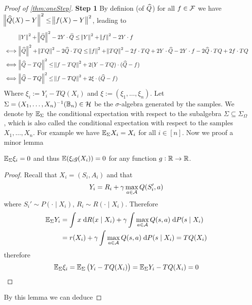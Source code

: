 \begin{proof}[Proof of \cref{thm:oneStep}]
  \textbf{Step 1}
  By definion (of $\widehat{Q}$) for all $f \in \mathcal{F}$ we have
  $\norm{\widehat{Q}(X) - Y}^2 \leq \norm{f(X) - Y}^2$, leading to
  \begin{align}
    & \norm{Y}^2 + \norm{\widehat{Q}}^2 - 2 Y\cdot \widehat{Q}
    \leq \norm{Y}^2 + \norm{f}^2 - 2 Y\cdot f
    \\ \iff & \norm{\widehat{Q}}^2 + \norm{TQ}^2 - 2 \widehat{Q}\cdot TQ 
    \leq \norm{f}^2 + \norm{TQ}^2 - 2 f\cdot TQ + 2 Y\cdot \widehat{Q}
    - 2 Y \cdot f - 2 \widehat{Q}\cdot TQ + 2f\cdot TQ
    \\ \iff & \norm{\widehat{Q} - TQ}^2
    \leq \norm{f - TQ}^2 + 2(Y - TQ)\cdot(\widehat{Q} - f) 
    \\ \iff & \norm{\widehat{Q} - TQ}^2
    \leq \norm{f - TQ}^2 + 2 \xi \cdot (\widehat{Q} - f)
    \label{eq:c2first}
  \end{align}
  Where $ \xi_i := Y_i - TQ(X_i) $ and $\xi := (\xi_1, \dots, \xi_n)$.
  Let $\Sigma = (X_1, \dots, X_n)^{-1}(\mathbb{B}_n) \in \mathcal{H}$
  be the $\sigma$-algebra generated by the samples.
  We denote by $\mathbb{E}_\Sigma$ the conditional expectation with respect to
  the subalgebra $\Sigma \subseteq \Sigma_\Omega$,
  which is also called the conditional expectation with respect to
  the samples $X_1, \dots, X_n$.
  For example we have $\mathbb{E}_\Sigma X_i = X_i$ for all $i \in [n]$.
  Now we proof a minor lemma
  \begin{prop}
    $\mathbb{E}_\Sigma \xi_i = 0$ and thus
    $\mathbb{E}(\xi_i g(X_i)) = 0$ for any function $g:\mathbb{R}\to \mathbb{R}$.
    \label{lem:YTQ}
  \end{prop}
  \begin{proof}
    Recall that $X_i = (S_i, A_i)$ and that
    \begin{align*}
      Y_i = R_i + \gamma \max_{a \in \mathcal{A}} Q(S_{i}', a)
    \end{align*}
    where $S_i' \sim P(\cdot \mid X_i)$, $R_i \sim R(\cdot \mid X_i)$.
    Therefore
    \begin{align*}
      \mathbb{E}_\Sigma Y_i &= \int x \; \mathrm{d} R(x \mid X_i) +
      \gamma \int \max_{a \in \mathcal{A}} Q(s, a) \; \mathrm{d} P(s \mid X_i)
      \\ & = r(X_i) + \gamma \int \max_{a \in \mathcal{A}} Q(s, a) \; \mathrm{d} P(s \mid X_i)
       = TQ(X_i)
    \end{align*}
    therefore
    \begin{align*}
      \mathbb{E}_\Sigma \xi_i = \mathbb{E}_\Sigma \left( Y_i - TQ(X_i) \right)
      = \mathbb{E}_\Sigma Y_i - TQ(X_i) = 0
    \end{align*}
  \end{proof}
  By this lemma we can deduce

\end{proof}
